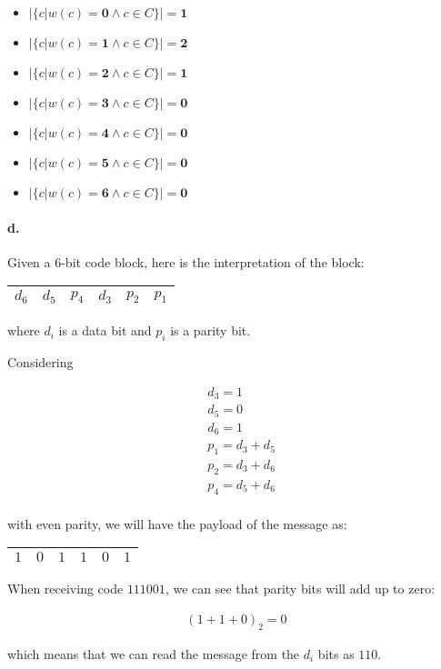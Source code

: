 \documentclass{article}
\begin{document}
\begin{itemize}
  \item $|\{c|w(c)=\textbf{0} \land c \in C\}| = \textbf{1}$
  \item $|\{c|w(c)=\textbf{1} \land c \in C\}| = \textbf{2}$
  \item $|\{c|w(c)=\textbf{2} \land c \in C\}| = \textbf{1}$
  \item $|\{c|w(c)=\textbf{3} \land c \in C\}| = \textbf{0}$
  \item $|\{c|w(c)=\textbf{4} \land c \in C\}| = \textbf{0}$
  \item $|\{c|w(c)=\textbf{5} \land c \in C\}| = \textbf{0}$
  \item $|\{c|w(c)=\textbf{6} \land c \in C\}| = \textbf{0}$
\end{itemize}

\paragraph{d.} Given a 6-bit code block, here is the interpretation of the block:

\begin{center}
  \begin{tabular}{|c|c|c|c|c|c|}
    \hline
    \cellcolor{YellowGreen} $d_6$ & \cellcolor{YellowGreen} $d_5$ & \cellcolor{GreenYellow} $p_4$ & \cellcolor{YellowGreen} $d_3$ & \cellcolor{GreenYellow} $p_2$ & \cellcolor{GreenYellow} $p_1$ \\
    \hline
  \end{tabular}
\end{center}

where $d_i$ is a data bit and $p_i$ is a parity bit.

Considering

\begin{align*}
  & d_3 = 1 \\
  & d_5 = 0 \\
  & d_6 = 1 \\
  & p_1 = d_3 + d_5 \\
  & p_2 = d_3 + d_6 \\
  & p_4 = d_5 + d_6 \\
\end{align*}

with even parity, we will have the payload of the message as:

\begin{center}
  \begin{tabular}{|c|c|c|c|c|c|}
    \hline
    \cellcolor{YellowGreen} $1$ & \cellcolor{YellowGreen} $0$ & \cellcolor{GreenYellow} $1$ & \cellcolor{YellowGreen} $1$ & \cellcolor{GreenYellow} $0$ & \cellcolor{GreenYellow} $1$ \\
    \hline
  \end{tabular}
\end{center}

When receiving code $111001$, we can see that parity bits will add up to zero:

\begin{align*}
  (1 + 1 + 0)_2=0
\end{align*}

which means that we can read the message from the $d_i$ bits as $110$.
\end{document}
